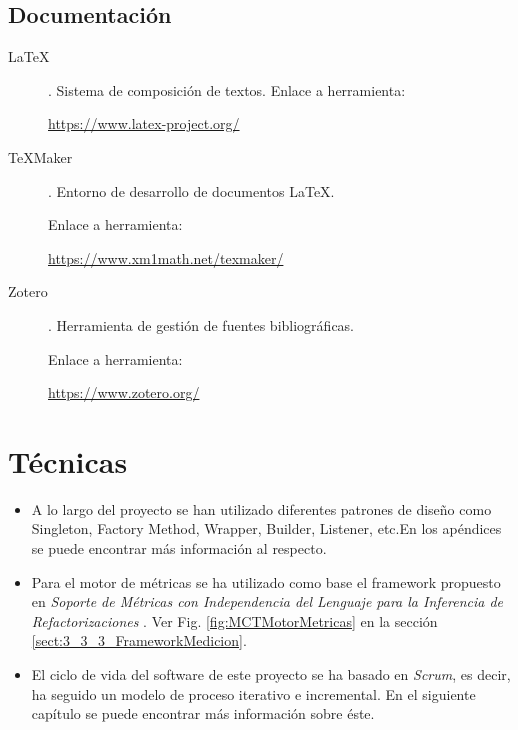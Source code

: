 \subsection{Documentación}
\begin{description}
	\item[LaTeX]. Sistema de composición de textos.
		Enlace a herramienta:
		
		\url{https://www.latex-project.org/}
		
	\item[TeXMaker]. Entorno de desarrollo de documentos LaTeX.
	
		Enlace a herramienta:
		
		\url{https://www.xm1math.net/texmaker/}
	
	\item[Zotero]. Herramienta de gestión de fuentes bibliográficas.
		
		Enlace a herramienta:
		
		\url{https://www.zotero.org/}
	
\end{description}
\section{Técnicas}
\begin{itemize}
	\item A lo largo del proyecto se han utilizado diferentes patrones de diseño \cite{gamma_patrones_2002} como Singleton, Factory Method, Wrapper, Builder, Listener, etc.En los apéndices se puede encontrar más información al respecto.
	
	\item Para el motor de métricas se ha utilizado como base el framework propuesto en \textit{Soporte de Métricas con Independencia del Lenguaje para la Inferencia de Refactorizaciones} \cite{marticorena_sanchez_soporte_2005}. Ver Fig. \ref{fig:MCTMotorMetricas} en la sección \ref{sect:3_3_3_FrameworkMedicion}.
	
	\item El ciclo de vida del software de este proyecto se ha basado en \textit{Scrum}\cite{scrum_master_scrum_2019}, es decir, ha seguido un modelo de proceso iterativo e incremental. En el siguiente capítulo se puede encontrar más información sobre éste.
\end{itemize}
